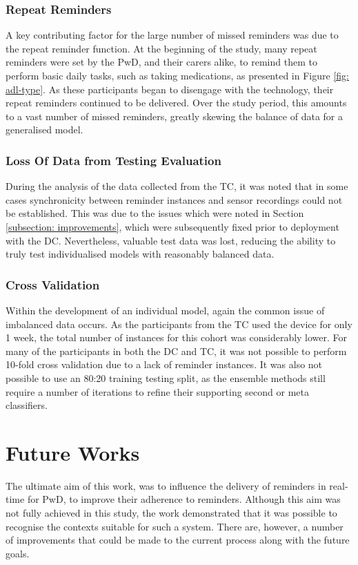 \subsubsection{Repeat Reminders}
A key contributing factor for the large number of missed reminders was due to the repeat reminder function. At the beginning of the study, many repeat reminders were set by the PwD, and their carers alike, to remind them to perform basic daily tasks, such as taking medications, as presented in Figure \ref{fig: adl-type}. As these participants began to disengage with the technology, their repeat reminders continued to be delivered. Over the study period, this amounts to a vast number of missed reminders, greatly skewing the balance of data for a generalised model.

\subsubsection{Loss Of Data from Testing Evaluation}
During the analysis of the data collected from the TC, it was noted that in some cases synchronicity between reminder instances and sensor recordings could not be established. This was due to the issues which were noted in Section \ref{subsection: improvements}, which were subsequently fixed prior to deployment with the DC. Nevertheless, valuable test data was lost, reducing the ability to truly test individualised models with reasonably balanced data.

\subsubsection{Cross Validation}
Within the development of an individual model, again the common issue of imbalanced data occurs. As the participants from the TC used the device for only 1 week, the total number of instances for this cohort was considerably lower. 
For many of the participants in both the DC and TC, it was not possible to perform 10-fold cross validation due to a lack of reminder instances. It was also not possible to use an 80:20 training testing split, as the ensemble methods still require a number of iterations to refine their supporting second or meta classifiers.

\section{Future Works}
The ultimate aim of this work, was to influence the delivery of reminders in real-time for PwD, to improve their adherence to reminders. Although this aim was not fully achieved in this study, the work demonstrated that it was possible to recognise the contexts suitable for such a system. There are, however, a number of improvements that could be made to the current process along with the future goals.

